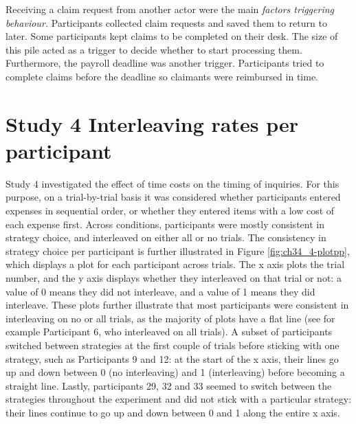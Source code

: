 Receiving a claim request from another actor were the main \textit{factors triggering behaviour.} Participants collected claim requests and saved them to return to later. Some participants kept claims to be completed on their desk. The size of this pile acted as a trigger to decide whether to start processing them. Furthermore, the payroll deadline was another trigger. Participants tried to complete claims before the deadline so claimants were reimbursed in time.

\chapter{Study 4 Interleaving rates per participant}\label{ch:S4_PartPlots}
Study 4 investigated the effect of time costs on the timing of inquiries. For this purpose, on a trial-by-trial basis it was considered whether participants entered expenses in sequential order, or whether they entered items with a low cost of each expense first. Across conditions, participants were mostly consistent in strategy choice, and interleaved on either all or no trials. The consistency in strategy choice per participant is further illustrated in Figure \ref{fig:ch34_4-plotpp}, which displays a plot for each participant across trials. The x axis plots the trial number, and the y axis displays whether they interleaved on that trial or not: a value of 0 means they did not interleave, and a value of 1 means they did interleave. These plots further illustrate that most participants were consistent in interleaving on no or all trials, as the majority of plots have a flat line (see for example Participant 6, who interleaved on all trials). A subset of participants switched between strategies at the first couple of trials before sticking with one strategy, such as Participants 9 and 12: at the start of the x axis, their lines go up and down between 0 (no interleaving) and 1 (interleaving) before becoming a straight line. Lastly, participants 29, 32 and 33 seemed to switch between the strategies throughout the experiment and did not stick with a particular strategy: their lines continue to go up and down between 0 and 1 along the entire x axis. 

